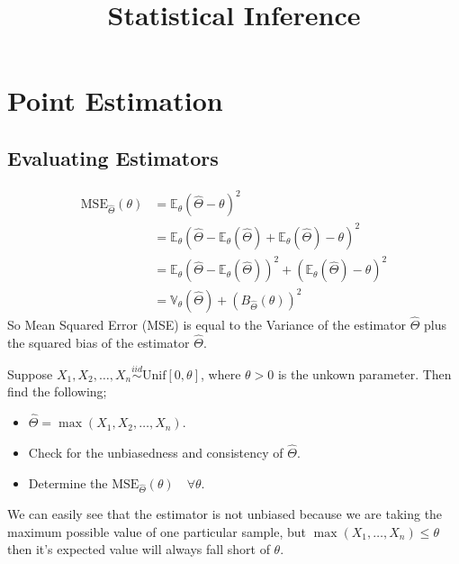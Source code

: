 \documentclass[12pt,a4paper]{article}
\title{Statistical Inference}
\begin{document}
   \section{Point Estimation}
   
   \subsection{Evaluating Estimators}
   \begin{align*}
    \mathrm{MSE}_{\hat{\Theta}}(\theta)&=\mathbb{E}_{\theta}(\hat{\Theta}-\theta)^2 \\
    &= \mathbb{E}_{\theta}(\hat{\Theta}-\mathbb{E}_{\theta}(\hat{\Theta})+ \mathbb{E}_{\theta}(\hat{\Theta})-\theta)^2\\
    &= \mathbb{E}_{\theta}\left( \hat{\Theta} - \mathbb{E}_{\theta}(\hat{\Theta})\right)^2 + 
    \left( \mathbb{E}_{\theta}(\hat{\Theta}) - \theta \right)^2 \\  
    &= \mathbb{V}_{\theta}(\hat{\Theta})+ (B_{\hat{\Theta}}(\theta))^2
   \end{align*}
    So Mean Squared Error (MSE) is equal to the Variance of the estimator \(\hat{\Theta}\) plus the squared bias of the estimator \(\hat{\Theta}\).

   Suppose \(X_{1},X_{2},\ldots,X_{n} \overset{iid}{\sim} \text{Unif}[0,\theta ]\), where \(\theta>0\) is the unkown parameter. Then find the following; 
   
   \begin{itemize}
    \item \(\hat{\Theta}=\max(X_{1},X_{2},\ldots,X_{n})\).
    \item Check for the unbiasedness and consistency of \(\hat{\Theta}\).
    \item Determine the \(\mathrm{MSE}_{\hat{\Theta}}(\theta)\quad \forall \theta\).     
   \end{itemize}

   We can easily see that the estimator is not unbiased because we are taking the maximum possible value of one particular sample, 
   but \(\max(X_{1},\ldots,X_{n})\leq \theta \) then it's expected value will always fall short of \(\theta\). 
   
\end{document}
